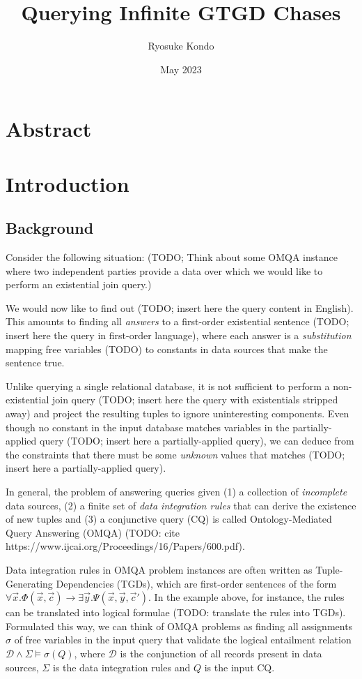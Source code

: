 \documentclass[12pt]{article}
\title{Querying Infinite GTGD Chases}
\author{Ryosuke Kondo}
\date{May 2023}
\begin{document}
\maketitle

\newpage
\tableofcontents
\newpage

\section*{Abstract}

\newpage
\section{Introduction}

\subsection{Background}

Consider the following situation: (TODO; Think about some OMQA instance where two independent parties provide a data over which we would like to perform an existential join query.)

We would now like to find out (TODO; insert here the query content in English). This amounts to finding all \emph{answers} to a first-order existential sentence (TODO; insert here the query in first-order language), where each answer is a \emph{substitution} mapping free variables (TODO) to constants in data sources that make the sentence true.

Unlike querying a single relational database, it is not sufficient to perform a non-existential join query (TODO; insert here the query with existentials stripped away) and project the resulting tuples to ignore uninteresting components. Even though no constant in the input database matches variables in the partially-applied query (TODO; insert here a partially-applied query), we can deduce from the constraints that there must be some \emph{unknown} values that matches (TODO; insert here a partially-applied query).

In general, the problem of answering queries given (1) a collection of \emph{incomplete} data sources, (2) a finite set of \emph{data integration rules} that can derive the existence of new tuples and (3) a conjunctive query (CQ) is called Ontology-Mediated Query Answering (OMQA) (TODO: cite https://www.ijcai.org/Proceedings/16/Papers/600.pdf).

Data integration rules in OMQA problem instances are often written as Tuple-Generating Dependencies (TGDs), which are first-order sentences of the form $\forall \vec{x}. \Phi(\vec{x}, \vec{c}) \rightarrow \exists \vec{y}. \Psi(\vec{x}, \vec{y}, \vec{c}')$. In the example above, for instance, the rules can be translated into logical formulae (TODO: translate the rules into TGDs). Formulated this way, we can think of OMQA problems as finding all assignments $\sigma$ of free variables in the input query that validate the logical entailment relation $\mathcal{D} \land \Sigma \models \sigma(Q)$, where $\mathcal{D}$ is the conjunction of all records present in data sources, $\Sigma$ is the data integration rules and $Q$ is the input CQ.
\end{document}
